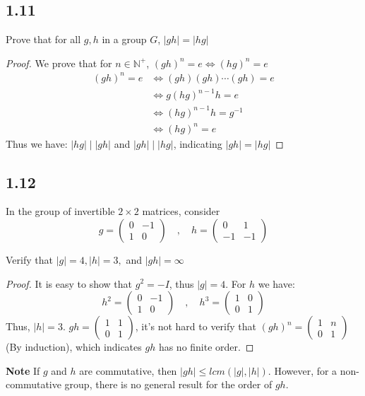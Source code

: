 \documentclass[a4paper, pdf, 12pt]{article}
\begin{document}
\subsection*{1.11} Prove that for all $g,h$ in a group $G$, $|gh| = |hg|$
\begin{proof}
  We prove that for $n\in \mathbb{N}^{+}$, $(gh)^{n}=e\Longleftrightarrow (hg)^{n}=e$
  $$
    \begin{aligned}
      (gh)^n=e & \Longleftrightarrow (gh)(gh)\cdots(gh)=e \\
               & \Longleftrightarrow g(hg)^{n-1}h = e     \\
               & \Longleftrightarrow(hg)^{n-1}h=g^{-1}    \\
               & \Longleftrightarrow(hg)^n = e
    \end{aligned}
  $$
  Thus we have: $|hg| \mid |gh|$ and $|gh| \mid |hg|$, indicating $|gh| = |hg|$
\end{proof}

\subsection*{1.12}
In the group of invertible $2\times 2$ matrices, consider
$$
  g =
  \begin{pmatrix}
    0 & -1 \\
    1 & 0
  \end{pmatrix}
  \quad
  ,
  \quad
  h =
  \begin{pmatrix}
    0  & 1  \\
    -1 & -1
  \end{pmatrix}
$$

\noindent Verify that $|g| = 4,|h| = 3,$ and $|gh| = \infty$

\begin{proof}
  It is easy to show that $g^{2}=-I$, thus $|g| = 4$.
  For $h$ we have:
  $$
    h^2 = \begin{pmatrix}
      0 & -1 \\
      1 & 0
    \end{pmatrix}\quad, \quad
    h^3 = \begin{pmatrix}
      1 & 0 \\
      0 & 1
    \end{pmatrix}
  $$
  Thus, $|h| = 3$.
  $gh = \begin{pmatrix}
      1 & 1 \\
      0 & 1
    \end{pmatrix}
  $, it's not hard to verify that $(gh)^n
    = \begin{pmatrix}
      1 & n \\
      0 & 1
    \end{pmatrix}
  $(By induction), which indicates $gh$ has no finite order.
\end{proof}
\noindent \textbf{Note} If $g$ and $h$ are commutative, then $|gh|\leq lcm(|g|,|h|)$. However, for a non-commutative group,
there is no general result for the order of $gh$.
\end{document}
